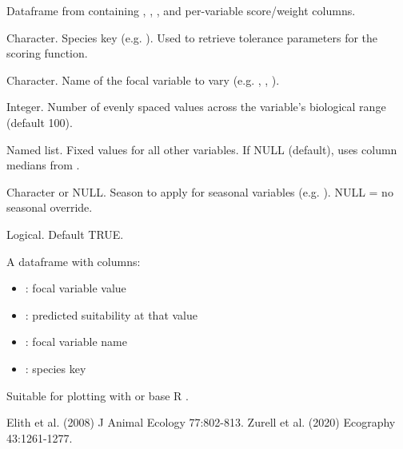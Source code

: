 \documentclass[a4paper]{book}
\begin{document}
\begin{Arguments}
\begin{ldescription}
\item[\code{predicted}] Dataframe from  containing , ,
, and per-variable score/weight columns.

\item[\code{species}] Character. Species key (e.g. ). Used to
retrieve tolerance parameters for the scoring function.

\item[\code{variable}] Character. Name of the focal variable to vary (e.g.
, , ).

\item[\code{n\_steps}] Integer. Number of evenly spaced values across the variable's
biological range (default 100).

\item[\code{background}] Named list. Fixed values for all other variables. If NULL
(default), uses column medians from .

\item[\code{season}] Character or NULL. Season to apply for seasonal variables
(e.g. ). NULL = no seasonal override.

\item[\code{verbose}] Logical. Default TRUE.
\end{ldescription}
\end{Arguments}
%
\begin{Value}
A dataframe with columns:
\begin{itemize}

\item{} : focal variable value
\item{} : predicted suitability at that value
\item{} : focal variable name
\item{} : species key

\end{itemize}


Suitable for plotting with  or base R .
\end{Value}
%
\begin{References}
Elith et al. (2008) J Animal Ecology 77:802-813.
Zurell et al. (2020) Ecography 43:1261-1277.
\end{References}
\end{document}

